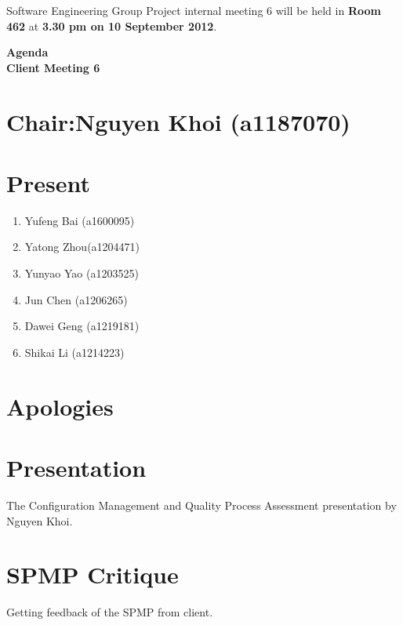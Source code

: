 \documentclass[11pt, a4paper]{article}
\begin{document}
\noindent Software Engineering Group Project internal meeting 6 will be held in {\bf Room 462} at {\bf 3.30 pm on 10 September 2012}.


\vspace*{15pt}

\begin{center}
\huge \bf Agenda \\Client Meeting 6
\end{center}



\section*{Chair:Nguyen Khoi (a1187070)}
\section*{Present}
\begin{enumerate}
\item Yufeng Bai (a1600095)
\item Yatong Zhou(a1204471)
\item Yunyao Yao (a1203525)
\item Jun Chen (a1206265)
\item Dawei Geng (a1219181)
\item Shikai Li (a1214223)
\end{enumerate}
\section{Apologies}

\section{Presentation}
The Configuration Management and Quality Process Assessment presentation by Nguyen Khoi.

\section{SPMP Critique}
Getting feedback of the SPMP from client. 
\end{document}
